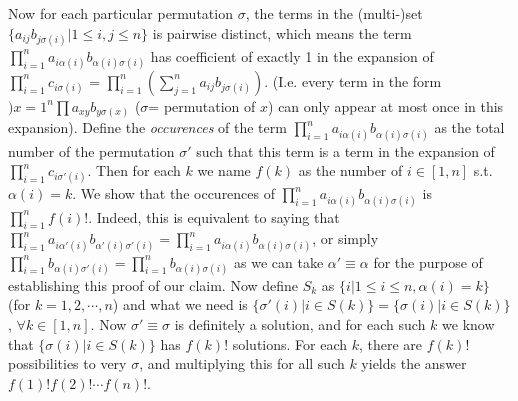 \documentclass[11pt,a4paper]{article}
\begin{document}
\begin {enumerate}
Now for each particular permutation $\sigma$, the terms in the (multi-)set $\{a_{ij}b_{j\sigma (i)}| 1\le i,j\le n\}$ is pairwise distinct, which means the term $\displaystyle\prod_{i=1}^{n}a_{i\alpha (i)}b_{\alpha (i)\sigma (i)}$ has coefficient of exactly 1 in the expansion of
$\displaystyle\prod_{i=1}^{n}c_{i\sigma (i)}$
=
$\displaystyle\prod_{i=1}^{n}\left(\displaystyle\sum_{j=1}^{n}a_{ij}b_{j\sigma(i)}\right)$.
(I.e. every term in the form $\displaystyle){x=1}^{n}\prod a_{xy}b_{y\sigma (x)}$ ($\sigma$= permutation of $x$) can only appear at most once in this expansion).
Define the \emph{occurences} of the term $\displaystyle\prod_{i=1}^{n}a_{i\alpha (i)}b_{\alpha (i)\sigma (i)}$ as the total number of the permutation $\sigma '$ such that this term is a term in the expansion of $\displaystyle\prod_{i=1}^{n}c_{i\sigma '(i)}$. Then for each $k$ we name $f(k)$ as the number of $i\in [1,n]$ s.t. $\alpha (i)=k$. We show that the occurences of $\displaystyle\prod_{i=1}^{n}a_{i\alpha (i)}b_{\alpha (i)\sigma (i)}$ is $\prod_{i=1}^{n} f(i)!$. Indeed, this is equivalent to saying that $\displaystyle\prod_{i=1}^{n} a_{i\alpha '(i)}b_{\alpha '(i)\sigma '(i)}=\displaystyle\prod_{i=1}^{n} a_{i\alpha (i)}b_{\alpha (i)\sigma (i)}$, or simply $\displaystyle\prod_{i=1}^{n} b_{\alpha (i)\sigma '(i)}=\displaystyle\prod_{i=1}^{n} b_{\alpha (i)\sigma (i)}$ as we can take $\alpha '\equiv\alpha$ for the purpose of establishing this proof of our claim. Now define $S_k$ as $\{i|1\le i\le n, \alpha (i)=k\}$ (for $k=1,2,\cdots ,n$) and what we need is $\{\sigma '(i)|i\in S(k)\}=\{\sigma (i)|i\in S(k)\}$, $\forall k\in[1,n]$. Now $\sigma'\equiv\sigma$ is definitely a solution, and for each such $k$ we know that $\{\sigma (i)|i\in S(k)\}$ has $f(k)!$ solutions. For each $k$, there are $f(k)!$ possibilities to very $\sigma$, and multiplying this for all such $k$ yields the answer $f(1)!f(2)!\cdots f(n)!$.


\end{enumerate}
\end{document}
